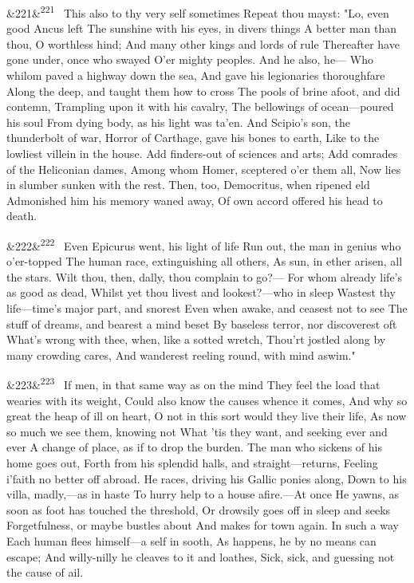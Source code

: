 \documentclass[12pt]{article}
\newcommand{\para}[1][]{\par\noindent\ifx&#1&\else\textsuperscript{\footnotesize #1}~\fi}
\begin{document}
\para[221] This also to thy very self sometimes Repeat thou mayst: "Lo, even good Ancus left The sunshine with his eyes, in divers things A better man than thou, O worthless hind; And many other kings and lords of rule Thereafter have gone under, once who swayed O'er mighty peoples. And he also, he--- Who whilom paved a highway down the sea, And gave his legionaries thoroughfare Along the deep, and taught them how to cross The pools of brine afoot, and did contemn, Trampling upon it with his cavalry, The bellowings of ocean---poured his soul From dying body, as his light was ta'en. And Scipio's son, the thunderbolt of war, Horror of Carthage, gave his bones to earth, Like to the lowliest villein in the house. Add finders-out of sciences and arts; Add comrades of the Heliconian dames, Among whom Homer, sceptered o'er them all, Now lies in slumber sunken with the rest. Then, too, Democritus, when ripened eld Admonished him his memory waned away, Of own accord offered his head to death.

\para[222] Even Epicurus went, his light of life Run out, the man in genius who o'er-topped The human race, extinguishing all others, As sun, in ether arisen, all the stars. Wilt thou, then, dally, thou complain to go?--- For whom already life's as good as dead, Whilst yet thou livest and lookest?---who in sleep Wastest thy life---time's major part, and snorest Even when awake, and ceasest not to see The stuff of dreams, and bearest a mind beset By baseless terror, nor discoverest oft What's wrong with thee, when, like a sotted wretch, Thou'rt jostled along by many crowding cares, And wanderest reeling round, with mind aswim."

\para[223] If men, in that same way as on the mind They feel the load that wearies with its weight, Could also know the causes whence it comes, And why so great the heap of ill on heart, O not in this sort would they live their life, As now so much we see them, knowing not What 'tis they want, and seeking ever and ever A change of place, as if to drop the burden. The man who sickens of his home goes out, Forth from his splendid halls, and straight---returns, Feeling i'faith no better off abroad. He races, driving his Gallic ponies along, Down to his villa, madly,---as in haste To hurry help to a house afire.---At once He yawns, as soon as foot has touched the threshold, Or drowsily goes off in sleep and seeks Forgetfulness, or maybe bustles about And makes for town again. In such a way Each human flees himself---a self in sooth, As happens, he by no means can escape; And willy-nilly he cleaves to it and loathes, Sick, sick, and guessing not the cause of ail.
\end{document}
